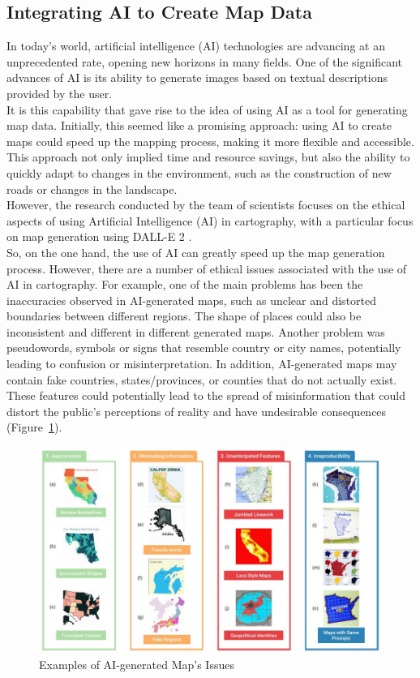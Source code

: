 \documentclass[10pt,oneside,english,a4paper]{article}
\begin{document}
\subsection{Integrating AI to Create Map Data} \label{future:ai}
In today's world, artificial intelligence (AI) technologies are advancing at an unprecedented rate, opening new horizons in many fields. One of the significant advances of AI is its ability to generate images based on textual descriptions provided by the user.
\\It is this capability that gave rise to the idea of using AI as a tool for generating map data. Initially, this seemed like a promising approach: using AI to create maps could speed up the mapping process, making it more flexible and accessible. This approach not only implied time and resource savings, but also the ability to quickly adapt to changes in the environment, such as the construction of new roads or changes in the landscape.
\\However, the research conducted by the team of scientists focuses on the ethical aspects of using Artificial Intelligence (AI) in cartography, with a particular focus on map generation using DALL-E 2 \cite{Kang2023}. 
\\So, on the one hand, the use of AI can greatly speed up the map generation process. However, there are a number of ethical issues associated with the use of AI in cartography. For example, one of the main problems has been the inaccuracies observed in AI-generated maps, such as unclear and distorted boundaries between different regions. The shape of places could also be inconsistent and different in different generated maps. Another problem was pseudowords, symbols or signs that resemble country or city names, potentially leading to confusion or misinterpretation. In addition, AI-generated maps may contain fake countries, states/provinces, or counties that do not actually exist. These features could potentially lead to the spread of misinformation that could distort the public's perceptions of reality and have undesirable consequences (Figure~\ref{fig:ai}).

\begin{figure}[h]
	\centering
	\includegraphics[scale = 0.6]{diagram8.jpg}
	\caption{Examples of AI-generated Map's Issues \cite{Kang2023}}
	\label{fig:ai}
\end{figure}
\end{document}
